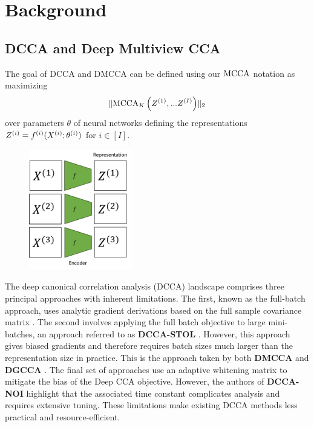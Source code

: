 \section{Background}

\subsection{DCCA and Deep Multiview CCA}

The goal of DCCA and DMCCA can be defined using our $\operatorname{MCCA}$ notation as maximizing
\begin{align}
    \label{eq:DMCCA-def}
    \lVert\operatorname{MCCA}_K\left(Z^{(1)}, ... Z^{(I)}\right)\rVert_2
\end{align}
over parameters $\theta$ of neural networks defining the representations $Z^{(i)}=f^{(i)}(X^{(i)};\theta^{(i)})$ for $i\in[I]$.

\begin{figure}
    \centering
    \includegraphics[width=0.4\textwidth]{figures/dcca_schematic}
\end{figure}

The deep canonical correlation analysis (DCCA) landscape comprises three principal approaches with inherent limitations. The first, known as the full-batch approach, uses analytic gradient derivations based on the full sample covariance matrix \citep{andrew2013deep}.
The second involves applying the full batch objective to large mini-batches, an approach referred to as \textbf{DCCA-STOL} \citep{wang2015unsupervised}. However, this approach gives biased gradients and therefore requires batch sizes much larger than the representation size in practice. This is the approach taken by both \textbf{DMCCA} \citep{somandepalli2019multimodal} and \textbf{DGCCA} \citep{benton2017deep} . The final set of approaches use an adaptive whitening matrix \citep{wang2015stochastic, chang2018scalable} to mitigate the bias of the Deep CCA objective. However, the authors of \textbf{DCCA-NOI} highlight that the associated time constant complicates analysis and requires extensive tuning. These limitations make existing DCCA methods less practical and resource-efficient.

